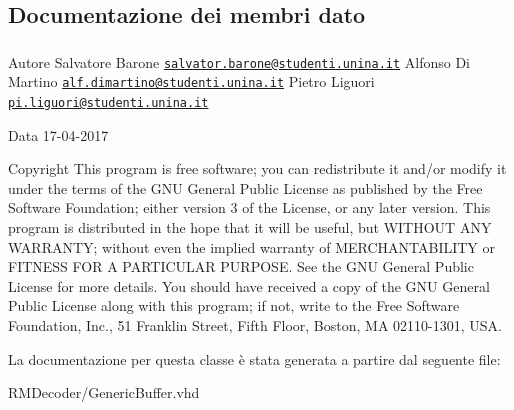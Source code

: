 \subsection{Documentazione dei membri dato}
\hypertarget{class_generic_buffer_a0a6af6eef40212dbaf130d57ce711256}{
\subsubsection[{ieee}]{\hspace{0.3cm}{\ttfamily [Library]}}}\label{class_generic_buffer_a0a6af6eef40212dbaf130d57ce711256}
\begin{DoxyAuthor}{Autore}
Salvatore Barone \href{mailto:salvator.barone@studenti.unina.it}{\tt salvator.\+barone@studenti.\+unina.\+it} Alfonso Di Martino \href{mailto:alf.dimartino@studenti.unina.it}{\tt alf.\+dimartino@studenti.\+unina.\+it} Pietro Liguori \href{mailto:pi.liguori@studenti.unina.it}{\tt pi.\+liguori@studenti.\+unina.\+it} 
\end{DoxyAuthor}
\begin{DoxyDate}{Data}
17-\/04-\/2017 
\end{DoxyDate}
\begin{DoxyCopyright}{Copyright}
This program is free software; you can redistribute it and/or modify it under the terms of the G\+N\+U General Public License as published by the Free Software Foundation; either version 3 of the License, or any later version. This program is distributed in the hope that it will be useful, but W\+I\+T\+H\+O\+U\+T A\+N\+Y W\+A\+R\+R\+A\+N\+T\+Y; without even the implied warranty of M\+E\+R\+C\+H\+A\+N\+T\+A\+B\+I\+L\+I\+T\+Y or F\+I\+T\+N\+E\+S\+S F\+O\+R A P\+A\+R\+T\+I\+C\+U\+L\+A\+R P\+U\+R\+P\+O\+S\+E. See the G\+N\+U General Public License for more details. You should have received a copy of the G\+N\+U General Public License along with this program; if not, write to the Free Software Foundation, Inc., 51 Franklin Street, Fifth Floor, Boston, M\+A 02110-\/1301, U\+S\+A. 
\end{DoxyCopyright}


La documentazione per questa classe è stata generata a partire dal seguente file\+:\begin{DoxyCompactItemize}
\item 
R\+M\+Decoder/Generic\+Buffer.\+vhd\end{DoxyCompactItemize}
